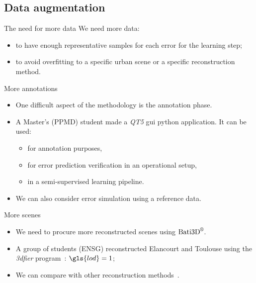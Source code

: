\documentclass{beamer}
\begin{document}
        \subsection{Data augmentation}
            \begin{frame}{The need for more data}
                We need more data:
                \begin{itemize}[label=$\blacktriangleright$, font=\color{IGNGreen}]
                    \item to have enough representative samples for each error for the learning step;
                    \item to avoid overfitting to a specific urban scene or a specific reconstruction method.
                \end{itemize}
            \end{frame}
            \begin{frame}{More annotations}
                \begin{itemize}[label=$\blacktriangleright$, font=\color{IGNGreen}]
                    \item<1-> One difficult aspect of the methodology is the annotation phase.
                    \item<2-> A Master's (PPMD) student made a \emph{QT5} \acrshort{gui} python application. It can be used:
                    \begin{itemize}[label=--]
                        \item<3-> for annotation purposes,
                        \item<4-> for error prediction verification in an operational setup,
                        \item<5-> in a semi-supervised learning pipeline.
                    \end{itemize}
                    \item<6-> We can also consider error simulation using a reference data.
                \end{itemize}
            \end{frame}
            \begin{frame}{More scenes}
                \begin{itemize}[label=$\blacktriangleright$, font=\color{IGNGreen}]
                    \item<1-> We need to procure more reconstructed scenes using $\text{Bati3D}^\text{\textregistered}$.
                    \item<2-> A group of students (ENSG) reconstructed Elancourt and Toulouse using the \emph{3dfier} program~\citep{ledoux2011topologically}: $\gls{lod} = 1$;
                    \item<3-> We can compare with other reconstruction methods~\citep{Lafarge2012,kelly2017bigsur}.
                \end{itemize}
            \end{frame}
\end{document}
